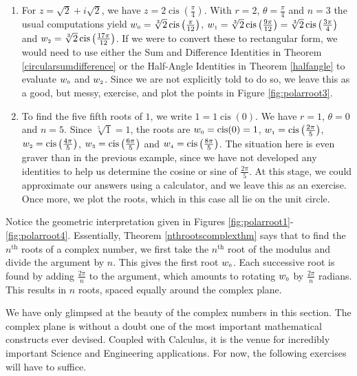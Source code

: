 {\begin{enumerate}
\item  For $z = \sqrt{2} + i \sqrt{2}$, we have $z = 2\operatorname{cis}\left(\frac{\pi}{4}\right)$.  With $r = 2$, $\theta = \frac{\pi}{4}$ and $n =3$ the usual computations yield $w_{\text{\tiny$0$}} = \sqrt[3]{2} \operatorname{cis}\left(\frac{\pi}{12}\right)$,  $w_{\text{\tiny$1$}} = \sqrt[3]{2} \operatorname{cis}\left(\frac{9\pi}{12}\right) = \sqrt[3]{2} \operatorname{cis}\left(\frac{3\pi}{4}\right) $ and  $w_{\text{\tiny$2$}} = \sqrt[3]{2} \operatorname{cis}\left(\frac{17\pi}{12}\right)$.  If we were to  convert these to rectangular form, we would need to use either the Sum and Difference Identities in Theorem \ref{circularsumdifference} or the Half-Angle Identities in Theorem \ref{halfangle} to evaluate $w_{\text{\tiny$0$}}$ and  $w_{\text{\tiny$2$}}$.  Since we are not explicitly told to do so, we leave this as a good, but messy, exercise, and plot the points in Figure \ref{fig:polarroot3}.


\item  To find the five fifth roots of $1$, we write $1 = 1 \operatorname{cis}(0)$.  We have $r = 1$, $\theta = 0$ and $n = 5$. Since $\sqrt[5]{1} = 1$, the roots are  $w_{\text{\tiny$0$}} = \operatorname{cis}(0) = 1$, $w_{\text{\tiny$1$}} = \operatorname{cis}\left(\frac{2\pi}{5}\right)$, $w_{\text{\tiny$2$}} = \operatorname{cis}\left(\frac{4\pi}{5}\right)$, $w_{\text{\tiny$3$}} = \operatorname{cis}\left(\frac{6\pi}{5}\right)$ and $w_{\text{\tiny$4$}} = \operatorname{cis}\left(\frac{8\pi}{5}\right)$.  The situation here is even graver than in the previous example, since we have not developed any identities to help us determine the cosine or sine of $\frac{2\pi}{5}$.  At this stage, we could approximate our answers using a calculator, and we leave this as an exercise. Once more, we plot the roots, which in this case all lie on the unit circle.


\end{enumerate}
}

\medskip

Notice the geometric interpretation given in Figures \ref{fig:polarroot1}-\ref{fig:polarroot4}.  Essentially,  Theorem \ref{nthrootscomplexthm} says that to find the $n^{\text{th}}$ roots of a complex number,  we first take the $n^{\text{th}}$ root of the modulus and divide the argument by $n$.  This gives the first root  $w_{\text{\tiny$0$}}$. Each successive root is found by adding  $\frac{2\pi}{n}$ to the argument, which amounts to rotating $w_{\text{\tiny$0$}}$ by $\frac{2\pi}{n}$ radians.  This results in $n$ roots, spaced equally around the complex plane.  

We have only glimpsed at the beauty of the complex numbers in this section.  The complex plane is without a doubt one of the most important mathematical constructs ever devised.  Coupled with Calculus, it is the venue for incredibly important Science and Engineering applications.  For now, the following exercises will have to suffice.


